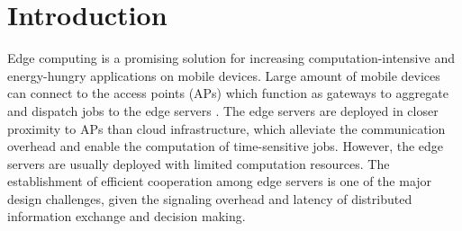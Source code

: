 \section{Introduction}
\label{sec:introduction}
Edge computing is a promising solution for increasing computation-intensive and energy-hungry applications on mobile devices.
Large amount of mobile devices can connect to the access points (APs) which function as gateways to aggregate and dispatch jobs to the edge servers \cite{MEC-SURVEY}.
The edge servers are deployed in closer proximity to APs than cloud infrastructure, which alleviate the communication overhead and enable the computation of time-sensitive jobs.
However, the edge servers are usually deployed with limited computation resources.
The establishment of efficient cooperation among edge servers is one of the major design challenges, given the signaling overhead and latency of distributed information exchange and decision making.

